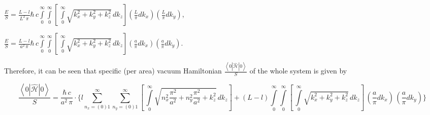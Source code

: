 \documentclass[twoside, 10pt]{article}
\begin{document}
\begin{multicols}{2}

\noindent
\(\frac{E}{S} = \frac{L-l}{L^2\,\pi}\hbar\,c\int\limits_{0}^{\infty}\int\limits_{0}^{\infty}\left[\,\int\limits_{0}^{\infty}\sqrt{k_x^2+k_y^2+k_z^2}\,dk_z\right] \left(\frac{L}{\pi}dk_x\right) \left(\frac{L}{\pi}dk_y\right)\),

\noindent
\(\frac{E}{S} = \frac{L-l}{a^2\,\pi}\hbar\,c\int\limits_{0}^{\infty}\int\limits_{0}^{\infty}\left[\,\int\limits_{0}^{\infty}\sqrt{k_x^2+k_y^2+k_z^2}\,dk_z\right] \left(\frac{a}{\pi}dk_x\right) \left(\frac{a}{\pi}dk_y\right)\).

    Therefore, it can be seen that specific (per area) vacuum Hamiltonian
\(\frac{\left<0|\hat{\mathcal{H}}|0\right>}{S}\) of the whole system is
given by

\end{multicols}


\noindent
\[
\frac{\left<0|\hat{\mathcal{H}}|0\right>}{S} = \frac{\hbar\,c}{a^2\,\pi}
\cdot \Bigg\{l\sum\limits_{n_x=(0)1}^{\infty}\sum\limits_{n_y=(0)1}^{\infty}\left[\,\int\limits_{0}^{\infty}\sqrt{n_x^2\frac{\pi^2}{a^2}+n_y^2\frac{\pi^2}{a^2}+k_z^2}\,dk_z\right] +
(L-l)\int\limits_{0}^{\infty}\int\limits_{0}^{\infty}\left[\,\int\limits_{0}^{\infty}\sqrt{k_x^2+k_y^2+k_z^2}\,dk_z\right]\,\left(\frac{a}{\pi}dk_x\right)\,\left(\frac{a}{\pi}dk_y\right)\Bigg\}
\]
\end{document}
